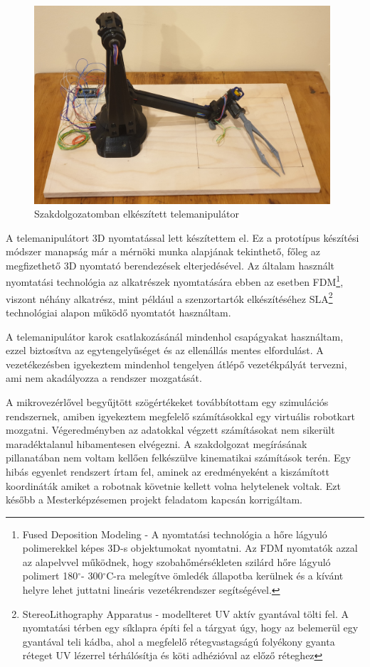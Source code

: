 \begin{figure}[!ht]
\centering
\includegraphics[width=110mm, keepaspectratio]{figures/Szakdoga/0_v_4_csipeszes}
\caption{Szakdolgozatomban elkészített telemanipulátor}
\label{fig:Szakdoga_telemanip_csipeszes}
\end{figure}

A telemanipulátort 3D nyomtatással lett készítettem el. Ez a prototípus készítési módszer manapság már a mérnöki munka alapjának tekinthető, főleg az megfizethető 3D nyomtató berendezések elterjedésével. Az általam használt nyomtatási technológia az alkatrészek nyomtatására ebben az esetben FDM\footnote{Fused Deposition Modeling - A nyomtatási technológia a hőre lágyuló polimerekkel képes 3D-s objektumokat nyomtatni. Az FDM nyomtatók azzal az alapelvvel működnek, hogy szobahőmérsékleten szilárd hőre lágyuló polimert 180$^{\circ}$- 300$^{\circ}$C-ra melegítve ömledék állapotba kerülnek és a kívánt helyre lehet juttatni lineáris vezetékrendszer segítségével.}, viszont néhány alkatrész, mint például a szenzortartók elkészítéséhez SLA\footnote{StereoLithography Apparatus - modellteret UV aktív gyantával tölti fel. A nyomtatási térben egy síklapra építi fel a tárgyat úgy, hogy az belemerül egy gyantával teli kádba, ahol a megfelelő rétegvastagságú folyékony gyanta réteget UV lézerrel térhálósítja és köti adhézióval az előző réteghez} technológiai alapon működő nyomtatót használtam. 

A telemanipulátor karok csatlakozásánál mindenhol csapágyakat használtam, ezzel biztosítva az egytengelyűséget és az ellenállás mentes elfordulást. A vezetékezésben igyekeztem mindenhol tengelyen átlépő vezetékpályát tervezni, ami nem akadályozza a rendszer mozgatását.

A mikrovezérlővel begyűjtött szögértékeket továbbítottam egy szimulációs rendszernek, amiben igyekeztem megfelelő számításokkal egy virtuális robotkart mozgatni. Végeredményben az adatokkal végzett számításokat nem sikerült maradéktalanul hibamentesen elvégezni. A szakdolgozat megírásának pillanatában nem voltam kellően felkészülve kinematikai számítások terén. Egy hibás egyenlet rendszert írtam fel, aminek az eredményeként a kiszámított koordináták amiket a robotnak követnie kellett volna helytelenek voltak. Ezt később a Mesterképzésemen projekt feladatom kapcsán korrigáltam.

